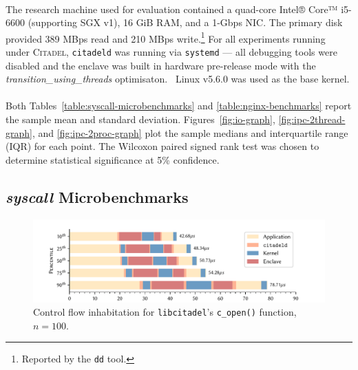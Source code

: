 \paragraph{} The research machine used for evaluation contained a quad-core Intel® Core™ i5-6600 (supporting SGX v1), 16 GiB RAM, and a 1-Gbps NIC. The primary disk provided 389 MBps read and 210 MBps write.\footnote{Reported by the \texttt{dd} tool.} For all experiments running under \textsc{Citadel}, \texttt{citadeld} was running via \texttt{systemd} --- all debugging tools were disabled and the enclave was built in hardware pre-release mode with the \textit{transition\_using\_threads} optimisaton.~\cite{sgx-switchless} Linux v5.6.0 was used as the base kernel.

\paragraph{} Both Tables~\ref{table:syscall-microbenchmarks} and \ref{table:nginx-benchmarks} report the sample mean and standard deviation. Figures~\ref{fig:io-graph}, \ref{fig:ipc-2thread-graph}, and \ref{fig:ipc-2proc-graph} plot the sample medians and interquartile range (IQR) for each point. The Wilcoxon paired signed rank test was chosen to determine statistical significance at 5\% confidence.~\cite{10.2307/3001968}

\subsection{\textit{syscall} Microbenchmarks}
\label{sec:syscall-microbenchmarks}

\begin{figure}[]
    \centering
    \includegraphics[width=\linewidth]{figures/graphs/open-anatomy.pdf}
    \vspace{-5mm}
    \caption{Control flow inhabitation for \texttt{libcitadel}'s \texttt{c\_open()} function, $n=100$.}
    \label{fig:open-anatomy}
\end{figure}


